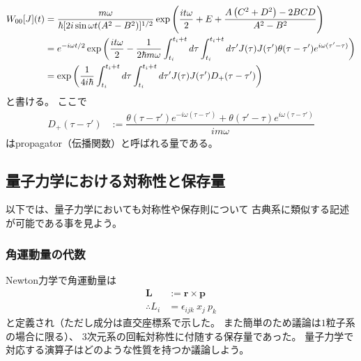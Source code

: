 \begin{align}
    W_{00}[J](t)
    &=
    \dfrac{m \omega}{
        \hbar
        [
            2 i \sin \omega t 
            (A^2 - B^2)
        ]^{1 / 2}
    }
    \exp\left(
        \dfrac{i t \omega}{2}
        +
        E
        +
        \dfrac{
            A
            \left(
                C^2 + D^2
            \right)
        -
            2 BCD
        }{
            A^2 - B^2
        }
    \right)
\notag\\&
    =
    e^{ - i \omega t / 2 }
    \exp\bigg(
        \dfrac{i t \omega}{2}
        -
        \dfrac{1}{2 \hbar m \omega}
        \int_{t_i}^{t_i + t}
            d\tau
        \int_{t_i}^{t_i + t}
            d\tau'
        J(\tau) J(\tau')
        \theta(\tau - \tau')
            e^{ i \omega (\tau' - \tau) }
    \bigg)
\notag\\&
    =
    \exp\bigg(
        \dfrac{1}{4 i \hbar}
        \int_{t_i}^{t_i + t}
            d\tau
        \int_{t_i}^{t_i + t}
            d\tau'
        J(\tau) J(\tau')
            D_+ (\tau - \tau')
    \bigg)
\end{align}
と書ける。
ここで
\begin{align}
    D_+ (\tau - \tau')
    &:=
    \dfrac{
        \theta(\tau - \tau')
        e^{ - i \omega (\tau - \tau') }
    +
        \theta(\tau' - \tau)
        e^{ i \omega (\tau - \tau') }    
    }{i m \omega}
\end{align}
はpropagator（伝播関数）と呼ばれる量である。

\subsection{量子力学における対称性と保存量}

以下では、量子力学においても対称性や保存則について
古典系に類似する記述が可能である事を見よう。

\subsubsection{角運動量の代数}
\label{subsubsec: angular momentum}

Newton力学で角運動量は
\begin{subequations}
\begin{align}
    \bm{L} &:= \bm{r} \times \bm{p}
    \\\therefore
    L_i &= \epsilon_{ijk} \ x_j \ p_k
\end{align}
\end{subequations}
と定義され（ただし成分は直交座標系で示した。
また簡単のため議論は$1$粒子系の場合に限る）、
3次元系の回転対称性に付随する保存量であった。
量子力学で対応する演算子はどのような性質を持つか議論しよう。

